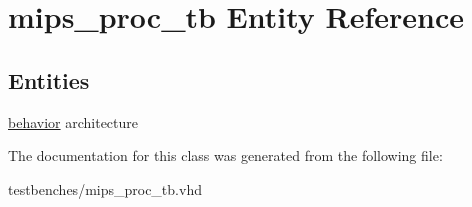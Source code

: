 \hypertarget{classmips__proc__tb}{\section{mips\-\_\-proc\-\_\-tb \-Entity \-Reference}
\label{classmips__proc__tb}
}
\subsection*{\-Entities}
\begin{DoxyCompactItemize}
\item 
\hyperlink{classmips__proc__tb_1_1behavior}{behavior} architecture
\end{DoxyCompactItemize}


\-The documentation for this class was generated from the following file\-:\begin{DoxyCompactItemize}
\item 
testbenches/mips\-\_\-proc\-\_\-tb.\-vhd\end{DoxyCompactItemize}
